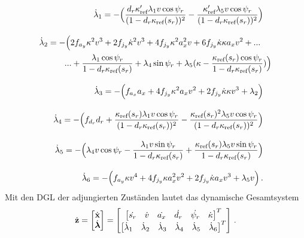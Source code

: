 \begin{align}
	\begin{split}
		\dot{\lambda}_1 &= -\Big(\frac{d_r\kappa'_{\textrm{ref}}\lambda_1v\cos{\psi_r}}{(1-d_r\kappa_{\textrm{ref}}(s_r))^2} - \frac{\kappa'_{\textrm{ref}}\lambda_5v\cos{\psi_r}}{(1-d_r\kappa_{\textrm{ref}}(s_r))^2}\Big)
	\end{split} \label{eq:dlambda1}
	\\[2ex]
	\begin{split}
		\dot{\lambda}_2 &= -\Big(2f_{a_y} \kappa^2v^3 + 2f_{j_y}\dot{\kappa}^2v^3 + 4f_{j_y}\kappa^2a_x^2v + 6f_{j_y}\dot{\kappa}\kappa a_xv^2 + ...\\
		&\qquad ... + \frac{\lambda_1\cos{\psi_r}}{1-d_r\kappa_{\textrm{ref}}(s_r)} + \lambda_4\sin{\psi_r} + \lambda_5(\kappa - \frac{\kappa_{\textrm{ref}}(s_r) \cos{\psi_r}}{1-d_r\kappa_{\textrm{ref}}(s_r)})\Big)
	\end{split} \label{eq:dlambda2}
	\\[2ex]
	\begin{split}
		\dot{\lambda}_3 &= -\Big(f_{a_x} a_x + 4f_{j_y}\kappa^2a_xv^2 + 2f_{j_y}\dot{\kappa}\kappa v^3 + \lambda_2 \Big)
	\end{split} \label{eq:dlambda3}
	\\[2ex]
	\begin{split}
		\dot{\lambda}_4 &= -\Big(f_{d_r} d_r + \frac{\kappa_{\textrm{ref}}(s_r)\lambda_1v\cos{\psi_r}}{(1-d_r\kappa_{\textrm{ref}}(s_r))^2} -\frac{\kappa_{\textrm{ref}}(s_r)^2\lambda_5v\cos{\psi_r}}{(1-d_r\kappa_{\textrm{ref}}(s_r))^2} \Big)
	\end{split} \label{eq:dlambda4}
	\\[2ex]
	\begin{split}
		\dot{\lambda}_5 &= -\Big(\lambda_4v\cos{\psi_r} - \frac{\lambda_1v\sin{\psi_r}}{1-d_r\kappa_{\textrm{ref}}(s_r)} + \frac{\kappa_{\textrm{ref}}(s_r)\lambda_5v\sin{\psi_r}}{1-d_r\kappa_{\textrm{ref}}(s_r)}\Big)
	\end{split} \label{eq:dlambda5}
	\\[2ex]
	\begin{split}
		\dot{\lambda}_6 &= -\Big(f_{a_y}\kappa v^4 + 4f_{j_y}\kappa a_x^2v^2 + 2f_{j_y} \dot{\kappa}a_xv^3 + \lambda_5v \Big)\,.
	\end{split} \label{eq:dlambda6}
\end{align}
Mit den \gls{DGL} der adjungierten Zuständen lautet das dynamische Gesamtsystem
\begin{equation}
	\dot{\boldsymbol{\mathrm{z}}} = \begin{bmatrix}
	\dot{\boldsymbol{\mathrm{x}}} \\
	\dot{\boldsymbol{\mathrm{\lambda}}}
	\end{bmatrix} =
	\begin{bmatrix}
		\begin{bmatrix}
		\dot{s_r} & \dot{v} & \dot{a_x} & \dot{d_r} & \dot{\psi_r} & \dot{\kappa}
		\end{bmatrix}^T\\
		\begin{bmatrix}
		\dot{\lambda}_1 & \dot{\lambda}_2 & \dot{\lambda}_3 & \dot{\lambda}_4 & \dot{\lambda}_5 & \dot{\lambda}_6
		\end{bmatrix}^T
	\end{bmatrix}\,.
\end{equation}
